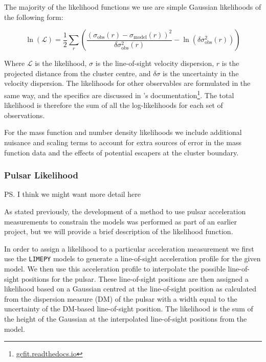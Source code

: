The majority of the likelihood functions we use are simple Gaussian likelihoods of the following form:

\begin{equation}
    \ln \left(\mathcal{L}\right)=\frac{1}{2}
    \sum_{r}\left(\frac{\left(\sigma_{\mathrm{obs}}(r)
        -\sigma_{\mathrm{model}}(r)\right)^{2}}{\delta \sigma_{\mathrm{obs}}^{2}(r)}
    -\ln \left(\delta \sigma_{\mathrm{obs}}^{2}(r)\right)\right)
\end{equation}

Where $\mathcal{L}$ is the likelihood, $\sigma$ is the line-of-sight velocity dispersion, $r$ is the
projected distance from the cluster centre, and $\delta \sigma$ is the uncertainty in the velocity
dispersion. The likelihoods for other observables are formulated in the same way, and the specifics
are discussed in 's documentation\footnote{\url{gcfit.readthedocs.io}}. The total
likelihood is therefore the sum of all the log-likelihoods for each set of observations.

For the mass function and number density likelihoods we include additional nuisance and scaling
terms to account for extra sources of error in the mass function data and the effects of potential
escapers at the cluster boundary.

\subsubsection{Pulsar Likelihood}

\ps{I think we might want more detail here}

As stated previously, the development of a method to use pulsar acceleration measurements to
constrain the models was performed as part of an earlier project, but we will provide a brief
description of the likelihood function.

In order to assign a likelihood to a particular acceleration measurement we first use the
\texttt{LIMEPY} models to generate a line-of-sight acceleration profile for the given model. We then
use this acceleration profile to interpolate the possible line-of-sight positions for the pulsar.
These line-of-sight positions are then assigned a likelihood based on a Gaussian centred at the
line-of-sight position as calculated from the dispersion measure (DM) of the pulsar with a width
equal to the uncertainty of the DM-based line-of-sight position. The likelihood is the sum of the
height of the Gaussian at the interpolated line-of-sight positions from the model.




